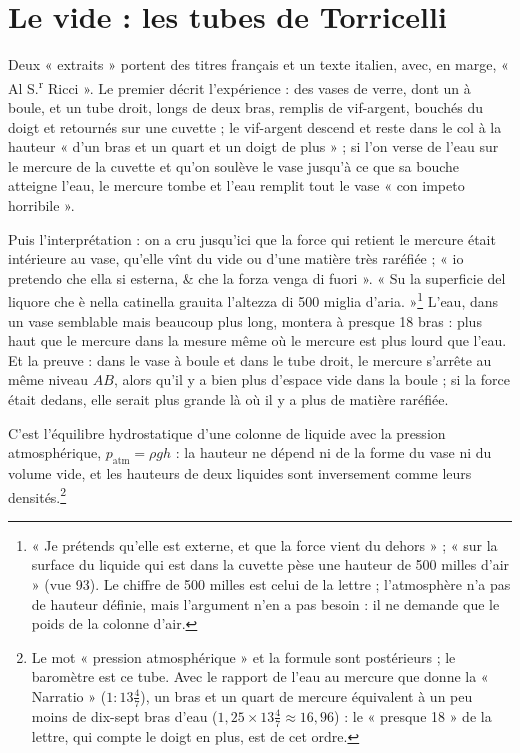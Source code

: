 \documentclass[11pt,a4paper]{article}
\begin{document}
\section*{Le vide : les tubes de Torricelli}

Deux « extraits » portent des titres français et un texte italien, avec, en
marge, « Al S.\textsuperscript{r} Ricci ». Le premier décrit l'expérience : des
vases de verre, dont un à boule, et un tube droit, longs de deux bras, remplis de
vif-argent, bouchés du doigt et retournés sur une cuvette ; le vif-argent descend
et reste dans le col à la hauteur « d'un bras et un quart et un doigt de plus » ;
si l'on verse de l'eau sur le mercure de la cuvette et qu'on soulève le vase
jusqu'à ce que sa bouche atteigne l'eau, le mercure tombe et l'eau remplit
tout le vase « con impeto horribile ».

Puis l'interprétation : on a cru jusqu'ici que la force qui retient le mercure
était intérieure au vase, qu'elle vînt du vide ou d'une matière très raréfiée ;
« io pretendo che ella si esterna, \& che la forza venga di fuori ». « Su la
superficie del liquore che è nella catinella grauita l'altezza di 500 miglia
d'aria. »\footnote{« Je prétends qu'elle est externe, et que la force vient du
dehors » ; « sur la surface du liquide qui est dans la cuvette pèse une hauteur
de 500 milles d'air » (vue 93). Le chiffre de 500 milles est celui de la lettre ;
l'atmosphère n'a pas de hauteur définie, mais l'argument n'en a pas besoin : il
ne demande que le poids de la colonne d'air.} L'eau, dans un vase semblable
mais beaucoup plus long, montera à presque 18 bras : plus haut que le mercure
dans la mesure même où le mercure est plus lourd que l'eau. Et la preuve : dans le
vase à boule et dans le tube droit, le mercure s'arrête au même niveau $AB$, alors
qu'il y a bien plus d'espace vide dans la boule ; si la force était dedans, elle
serait plus grande là où il y a plus de matière raréfiée.

C'est l'équilibre hydrostatique d'une colonne de liquide avec la pression
atmosphérique, $p_{\text{atm}} = \rho g h$ : la hauteur ne dépend ni de la forme du
vase ni du volume vide, et les hauteurs de deux liquides sont inversement comme
leurs densités.\footnote{Le mot « pression atmosphérique » et la formule sont
postérieurs ; le baromètre est ce tube. Avec le rapport de l'eau au mercure que
donne la « Narratio » ($1:13\tfrac47$), un bras et un quart de mercure équivalent
à un peu moins de dix-sept bras d'eau ($1{,}25 \times 13\tfrac47 \approx 16{,}96$) : le « presque 18 » de la lettre, qui compte
le doigt en plus, est de cet ordre.}
\end{document}
